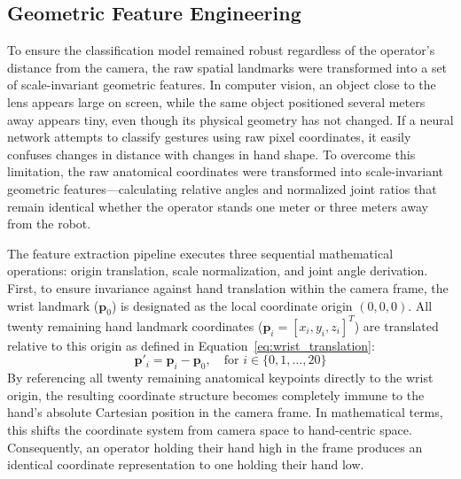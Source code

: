 \subsection{Geometric Feature Engineering}
To ensure the classification model remained robust regardless of the operator's distance from the camera, the raw spatial landmarks were transformed into a set of scale-invariant geometric features. In computer vision, an object close to the lens appears large on screen, while the same object positioned several meters away appears tiny, even though its physical geometry has not changed. If a neural network attempts to classify gestures using raw pixel coordinates, it easily confuses changes in distance with changes in hand shape. To overcome this limitation, the raw anatomical coordinates were transformed into scale-invariant geometric features—calculating relative angles and normalized joint ratios that remain identical whether the operator stands one meter or three meters away from the robot.

The feature extraction pipeline executes three sequential mathematical operations: origin translation, scale normalization, and joint angle derivation. First, to ensure invariance against hand translation within the camera frame, the wrist landmark ($\mathbf{p}_0$) is designated as the local coordinate origin $(0,0,0)$. All twenty remaining hand landmark coordinates ($\mathbf{p}_i = [x_i, y_i, z_i]^T$) are translated relative to this origin as defined in Equation~\eqref{eq:wrist_translation}:
\begin{equation}
\label{eq:wrist_translation}
\mathbf{p}'_i = \mathbf{p}_i - \mathbf{p}_0, \quad \text{for } i \in \{0, 1, \dots, 20\}
\end{equation}
By referencing all twenty remaining anatomical keypoints directly to the wrist origin, the resulting coordinate structure becomes completely immune to the hand's absolute Cartesian position in the camera frame. In mathematical terms, this shifts the coordinate system from camera space to hand-centric space. Consequently, an operator holding their hand high in the frame produces an identical coordinate representation to one holding their hand low.

